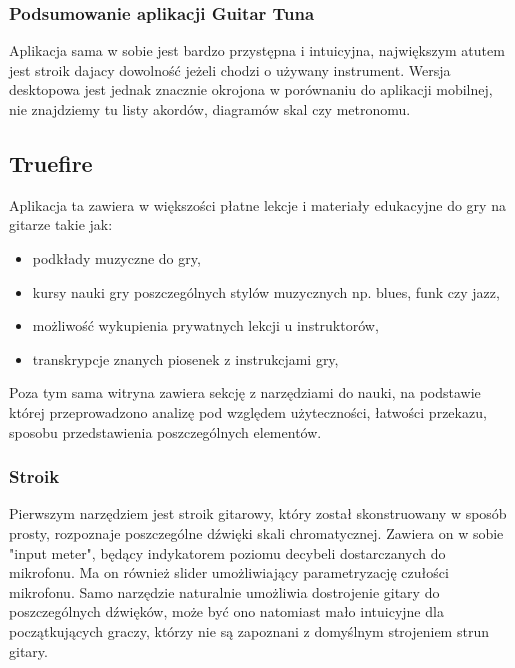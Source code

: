 
\subsubsection{Podsumowanie aplikacji Guitar Tuna}

Aplikacja sama w sobie jest bardzo przystępna i intuicyjna, największym atutem jest stroik dajacy dowolność jeżeli chodzi o używany instrument. Wersja desktopowa jest jednak znacznie okrojona w porównaniu do aplikacji mobilnej, nie znajdziemy tu listy akordów, diagramów skal czy metronomu. 

\subsection{Truefire}

Aplikacja ta zawiera w większości płatne lekcje i materiały edukacyjne do gry na gitarze takie jak:

\begin{itemize}
    \item podkłady muzyczne do gry,
    \item kursy nauki gry poszczególnych stylów muzycznych np. blues, funk czy jazz,
    \item możliwość wykupienia prywatnych lekcji u instruktorów,
    \item transkrypcje znanych piosenek z instrukcjami gry,
\end{itemize}

Poza tym sama witryna zawiera sekcję z narzędziami do nauki, na podstawie której przeprowadzono analizę pod względem użyteczności, łatwości przekazu, sposobu przedstawienia poszczególnych elementów. 

\subsubsection{Stroik}

Pierwszym narzędziem jest stroik gitarowy, który został skonstruowany w sposób prosty, rozpoznaje poszczególne dźwięki skali chromatycznej. Zawiera on w sobie "input meter", będący indykatorem poziomu decybeli dostarczanych do mikrofonu. Ma on również slider umożliwiający parametryzację czułości mikrofonu. Samo narzędzie naturalnie umożliwia dostrojenie gitary do poszczególnych dźwięków, może być ono natomiast mało intuicyjne dla początkujących graczy, którzy nie są zapoznani z domyślnym strojeniem strun gitary.

